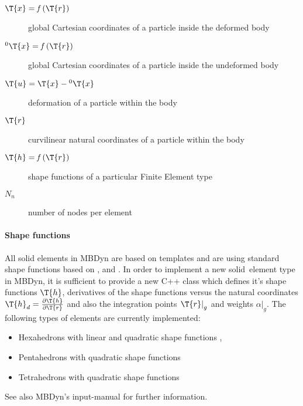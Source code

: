 \begin{description}
\item[$\T{x}=\mathit{f}\left(\T{r}\right)$] global Cartesian coordinates of a particle inside the deformed body
\item[$^0\T{x}=\mathit{f}\left(\T{r}\right)$] global Cartesian coordinates of a particle inside the undeformed body
\item[$\T{u}=\T{x}-{^0}\T{x}$] deformation of a particle within the body
\item[$\T{r}$] curvilinear natural coordinates of a particle within the body
\item[$\T{h}=\mathit{f}\left(\T{r}\right)$] shape functions of a particular Finite Element type
\item[$N_n$] number of nodes per element
\end{description}

\paragraph{Shape functions}
All solid elements in MBDyn are based on templates and are using standard shape functions based on \cite{BATHE2016}, \cite{DHONDT2004} and \cite{CODEASTERR30301}.
In order to implement a new solid~element type in MBDyn, it is sufficient to provide a new C++ class which defines it's shape functions $\T{h}$,
derivatives of the shape functions versus the natural coordinates $\T{h}_d=\frac{\partial \T{h}}{\partial \T{r}}$ and also the integration points $\left.\T{r}\right\vert_g$ and weights $\left.\alpha\right\vert_g$.
The following types of elements are currently implemented:
\begin{itemize}
\item Hexahedrons with linear and quadratic shape functions \cite{BATHE2016}, \cite{DHONDT2004}
\item Pentahedrons with quadratic shape functions \cite{CODEASTERR30301}
\item Tetrahedrons with quadratic shape functions \cite{CODEASTERR30301}
\end{itemize}
See also MBDyn's input-manual for further information.

